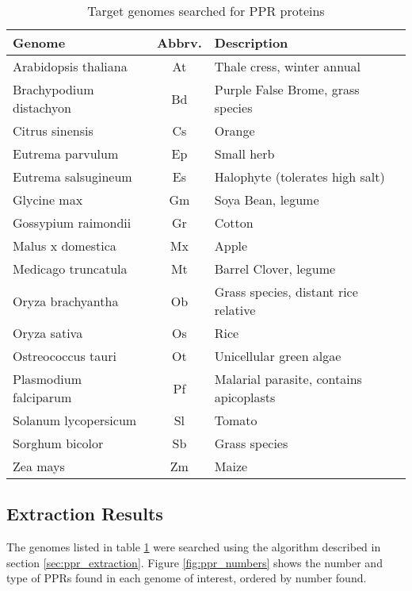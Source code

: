 \begin{table}
  \centering
  \begin{tabular}{l | c | p{7cm}}
    \textbf{Genome} & \textbf{Abbrv.} & \textbf{Description} \\ \hline
    Arabidopsis thaliana     & At & Thale cress, winter annual \\ \hline  
    Brachypodium distachyon  & Bd & Purple False Brome, grass species\\ \hline
    Citrus sinensis          & Cs & Orange \\ \hline
    Eutrema parvulum         & Ep & Small herb\\ \hline
    Eutrema salsugineum      & Es & Halophyte (tolerates high salt) \\ \hline
    Glycine max              & Gm & Soya Bean, legume \\ \hline
    Gossypium raimondii      & Gr & Cotton \\ \hline
    Malus x domestica        & Mx & Apple \\ \hline
    Medicago truncatula      & Mt & Barrel Clover, legume \\ \hline
    Oryza brachyantha        & Ob & Grass species, distant rice relative\\ \hline
    Oryza sativa             & Os & Rice \\ \hline
    Ostreococcus tauri       & Ot & Unicellular green algae \\ \hline
    Plasmodium falciparum    & Pf & Malarial parasite, contains apicoplasts \\ \hline
    Solanum lycopersicum     & Sl & Tomato \\ \hline
    Sorghum bicolor          & Sb & Grass species \\ \hline
    Zea mays                 & Zm & Maize \\ \hline
  \end{tabular}
  \caption{Target genomes searched for PPR proteins}
  \label{tab:genomes}
\end{table}

\subsection{Extraction Results}
\label{sec:survey_results}

The genomes listed in table \ref{tab:genomes} were searched using the algorithm
described in section \ref{sec:ppr_extraction}.
Figure \ref{fig:ppr_numbers} shows the number and type of PPRs found in each
genome of interest, ordered by number found.

